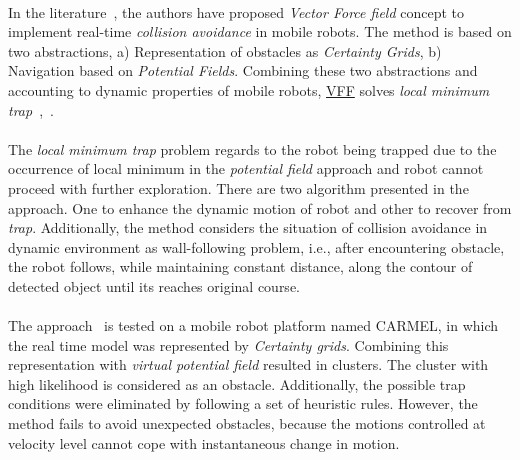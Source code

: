 \paragraph{}In the literature~\cite{borenstein1989real}, the authors have proposed \textit{Vector Force field} concept to implement real-time \textit{collision avoidance} in mobile robots. The method is based on two abstractions, a) Representation of obstacles as \textit{Certainty Grids}, b) Navigation based on \textit{Potential Fields}. Combining these two abstractions and accounting to dynamic properties of mobile robots, \hyperref[vff]{VFF} solves \textit{local minimum trap}~\cite{julia2008local},~\cite{park2003new}. 

\paragraph{}The \textit{local minimum trap} problem regards to the robot being trapped due to the occurrence of local minimum in the \textit{potential field} approach and robot cannot proceed with further exploration. There are two algorithm presented in the approach. One to enhance the dynamic motion of robot and other to recover from \textit{trap}. Additionally, the method considers the situation of collision avoidance in dynamic environment as wall-following problem, i.e., after encountering obstacle, the robot follows, while maintaining constant distance, along the contour of detected object until its reaches original course. 

\paragraph{}The approach~\cite{borenstein1989real} is tested on a mobile robot platform named CARMEL, in which the real time model was represented by \textit{Certainty grids}. Combining this representation with \textit{virtual potential field} resulted in clusters. The cluster with high likelihood is considered as an obstacle. Additionally, the possible trap conditions were eliminated by following a set of heuristic rules. However, the method fails to avoid unexpected obstacles, because the motions controlled at velocity level cannot cope with instantaneous change in motion.



